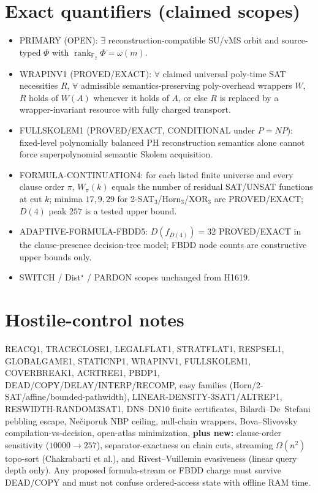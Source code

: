 \documentclass[11pt]{article}
\begin{document}
\section*{Exact quantifiers (claimed scopes)}
\begin{itemize}
\item PRIMARY (OPEN): $\exists$ reconstruction-compatible SU/vMS orbit and source-typed
  $\Phi$ with $\operatorname{rank}_{\mathbb F_2}\Phi=\omega(m)$.
\item WRAPINV1 (PROVED/EXACT): $\forall$ claimed universal poly-time SAT necessities $R$,
  $\forall$ admissible semantics-preserving poly-overhead wrappers $W$, $R$ holds of $W(A)$
  whenever it holds of $A$, or else $R$ is replaced by a wrapper-invariant resource with
  fully charged transport.
\item FULLSKOLEM1 (PROVED/EXACT, CONDITIONAL under $P=NP$): fixed-level polynomially
  balanced PH reconstruction semantics alone cannot force superpolynomial semantic Skolem
  acquisition.
\item FORMULA-CONTINUATION4: for each listed finite universe and every clause order $\pi$,
  $W_\pi(k)$ equals the number of residual SAT/UNSAT functions at cut $k$; minima $17,9,29$
  for 2-SAT$_3$/Horn$_3$/XOR$_3$ are PROVED/EXACT; $D(4)$ peak $257$ is a tested upper bound.
\item ADAPTIVE-FORMULA-FBDD5: $D(f_{D(4)})=32$ PROVED/EXACT in the clause-presence decision-tree
  model; FBDD node counts are constructive upper bounds only.
\item SWITCH / Dist$^\star$ / PARDON scopes unchanged from H1619.
\end{itemize}

\section*{Hostile-control notes}
REACQ1, TRACECLOSE1, LEGALFLAT1, STRATFLAT1, RESPSEL1, GLOBALGAME1, STATICNP1, WRAPINV1,
FULLSKOLEM1, COVERBREAK1, ACRTREE1, PBDP1, DEAD/COPY/DELAY/INTERP/RECOMP, easy families
(Horn/2-SAT/affine/bounded-pathwidth), LINEAR-DENSITY-3SAT1/ALTREP1, RESWIDTH-RANDOM3SAT1,
DN8--DN10 finite certificates, Bilardi--De~Stefani pebbling escape, Ne\v{c}iporuk NBP ceiling,
null-chain wrappers, Bova--Slivovsky compilation-vs-decision, open-atlas minimization,
\textbf{plus new:} clause-order sensitivity ($10000\to257$), separator-exactness on chain cuts,
streaming $\Omega(n^2)$ topo-sort (Chakrabarti et al.), and Rivest--Vuillemin evasiveness
(linear query depth only). Any proposed formula-stream or FBDD charge must survive DEAD/COPY
and must not confuse ordered-access state with offline RAM time.
\end{document}
